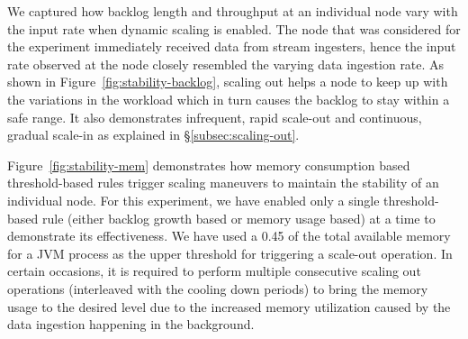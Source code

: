 We captured how backlog length and throughput at an individual node vary with the input rate when dynamic scaling is enabled.
The node that was considered for the experiment immediately received data from stream ingesters, hence the input rate observed at the node closely resembled the varying data ingestion rate.
As shown in Figure~\ref{fig:stability-backlog}, scaling out helps a node to keep up with the variations in the workload which in turn causes the backlog to stay within a safe range.
It also demonstrates infrequent, rapid scale-out and continuous, gradual scale-in as explained in \S\ref{subsec:scaling-out}.

Figure~\ref{fig:stability-mem} demonstrates how memory consumption based threshold-based rules trigger scaling maneuvers to maintain the stability of an individual node.
For this experiment, we have enabled only a single threshold-based rule (either backlog growth based or memory usage based) at a time to demonstrate its effectiveness.
We have used a 0.45 of the total available memory for a JVM process as the upper threshold for triggering a scale-out operation.
In certain occasions, it is required to perform multiple consecutive scaling out operations (interleaved with the cooling down periods) to bring the memory usage to the desired level due to the increased memory utilization caused by the data ingestion happening in the background.
